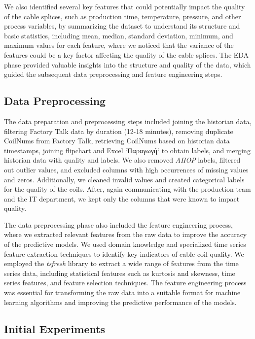 We also identified several key features that could potentially impact the
quality of the cable splices, such as production time, temperature, pressure,
and other process variables, by summarizing the dataset to understand its
structure and basic statistics, including mean, median, standard deviation,
minimum, and maximum values for each feature, where we noticed that the
variance of the features could be a key factor affecting the quality of the
cable splices. The EDA phase provided valuable insights into the structure and
quality of the data, which guided the subsequent data preprocessing and feature
engineering steps.

\subsection{Data Preprocessing}

The data preparation and preprocessing steps included joining the historian
data, filtering Factory Talk data by duration (12-18 minutes), removing
duplicate CoilNums from Factory Talk, retrieving CoilNums based on historian
data timestamps, joining flipchart and Excel `Παραγωγή` to obtain labels, and
merging historian data with quality and labels. We also removed \emph{ΑΠΟΡ}
labels, filtered out outlier values, and excluded columns with high occurrences
of missing values and zeros. Additionally, we cleaned invalid values and
created categorical labels for the quality of the coils. After, again
communicating with the production team and the IT department, we kept only the
columns that were known to impact quality.

The data preprocessing phase also included the feature engineering process,
where we extracted relevant features from the raw data to improve the accuracy
of the predictive models. We used domain knowledge and specialized time series
feature extraction techniques to identify key indicators of cable coil quality.
We employed the \emph{tsfresh} library to extract a wide range of features from
the time series data, including statistical features such as kurtosis and
skewness, time series features, and feature selection techniques. The feature
engineering process was essential for transforming the raw data into a suitable
format for machine learning algorithms and improving the predictive performance
of the models.

\subsection{Initial Experiments}

